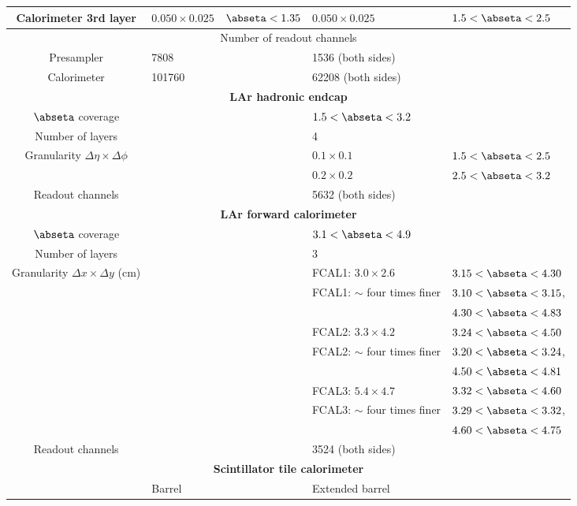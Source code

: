 \documentclass[cernpreprint, atlasdraft=false, UKenglish,british,orcidlogo, texmf, orcidlogo]{atlasdoc}
\begin{document}
\begin{table}
\begin{center}
\begin{tabular}{|c|l r|l l|}
Calorimeter 3rd layer   &
$0.050\times 0.025$ & $\abseta<1.35$  & $0.050\times 0.025$
& $1.5<\abseta<2.5$ \\
\hline
\multicolumn{5}{|c|}{Number of readout channels} \\
\hline
Presampler & \num{7808} & & \num{1536} (both sides) & \\
Calorimeter & \num{101760} & & \num{62208} (both sides)& \\
\hline
\hline
\multicolumn{5}{|c|}{{\textbf{\gls{LAr} hadronic endcap }}} \\
\hline
$\abseta$ coverage & & & $1.5<\abseta<3.2$ & \\
Number of layers & & & 4 & \\
\hline
Granularity ${\Delta\eta\times\Delta\phi}$ & & &
$0.1\times 0.1$ & $1.5<\abseta<2.5$ \\
&  & &  $0.2\times 0.2$ & $2.5<\abseta<3.2$  \\
\hline
Readout channels & & & 5632 (both sides) & \\
\hline
\hline
\multicolumn{5}{|c|}{{\textbf{\gls{LAr} forward calorimeter }}} \\
\hline
$\abseta$ coverage & & & $3.1<\abseta<4.9$ & \\
Number of layers & & & 3 & \\
\hline
Granularity ${\Delta x\times\Delta y }$ (cm)& & & \gls{FCAL}1:  $3.0 \times 2.6$ &  $3.15<\abseta<4.30$  \\
& & & \gls{FCAL}1: $\sim$ four times finer &  $3.10<\abseta<3.15$,\\
& & &                          &  $4.30<\abseta<4.83$ \\
& & & \gls{FCAL}2:  $3.3 \times 4.2$ &  $3.24<\abseta<4.50$\\
& & & \gls{FCAL}2:  $\sim$ four times finer &  $3.20<\abseta<3.24$,\\
& & &         &  $4.50<\abseta<4.81$\\
& & & \gls{FCAL}3: $5.4 \times 4.7$ &  $3.32<\abseta<4.60$\\
& & & \gls{FCAL}3: $\sim$ four times finer &  $3.29<\abseta<3.32$,\\
& & &                         &  $4.60<\abseta<4.75$\\
\hline
Readout channels & & & \num{3524} (both sides) &  \\
\hline
\hline
\multicolumn{5}{|c|}{{\textbf{Scintillator tile calorimeter}}} \\
\hline
& Barrel & & Extended barrel & \\
\hline

\end{tabular}
\end{center}
\end{table}
\end{document}
